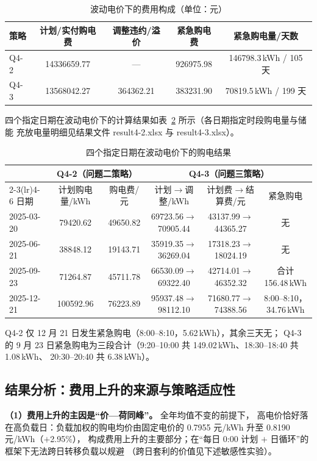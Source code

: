 \begin{table}[!htbp]
\caption{波动电价下的费用构成（单位：元）}\label{tab:q4-comp}
\centering
\small
\setlength{\tabcolsep}{5pt}
\begin{tabular}{lcccc}
\toprule
策略 & 计划/实付购电费 & 调整违约/溢价 & 紧急购电费 & 紧急购电量/天数 \\
\midrule
Q4-2 & 14336659.77 & --- & 926975.98 & 146798.3\,kWh / 105 天 \\
Q4-3 & 13568042.27 & 364362.21 & 383231.90 & 70819.5\,kWh / 199 天 \\
\bottomrule
\end{tabular}
\end{table}

四个指定日期在波动电价下的计算结果如表~\ref{tab:q4-days} 所示（各日期指定时段购电量与储能
充放电量明细见结果文件 result4-2.xlsx 与 result4-3.xlsx）。

\begin{table}[!htbp]
\caption{四个指定日期在波动电价下的购电结果}\label{tab:q4-days}
\centering
\small
\setlength{\tabcolsep}{4pt}
\begin{tabular}{lccccc}
\toprule
 & \multicolumn{2}{c}{Q4-2（问题二策略）} & \multicolumn{3}{c}{Q4-3（问题三策略）} \\
\cmidrule(lr){2-3}\cmidrule(lr){4-6}
日期 & 计划购电量/kWh & 购电费/元 & 计划$\to$调整/kWh & 计划费$\to$结算费/元 & 紧急购电 \\
\midrule
2025-03-20 & 79420.62 & 49650.82 & 69723.56$\to$70905.44 & 43137.99$\to$44365.27 & 无 \\
2025-06-21 & 38848.12 & 19143.71 & 35919.35$\to$36269.04 & 17318.23$\to$18024.19 & 无 \\
2025-09-23 & 71264.87 & 45711.78 & 66530.09$\to$69322.40 & 42714.01$\to$46352.32 & 合计 156.48\,kWh \\
2025-12-21 & 100592.96 & 76223.89 & 95937.48$\to$98112.10 & 71680.77$\to$74388.56 & 8:00--8:10，34.76\,kWh \\
\bottomrule
\end{tabular}
\end{table}

Q4-2 仅 12 月 21 日发生紧急购电（8:00--8:10，5.62\,kWh），其余三天无；
Q4-3 的 9 月 23 日紧急购电为三段合计（9:20--10:00 共 149.02\,kWh、18:30--18:40 共 1.08\,kWh、
20:30--20:40 共 6.38\,kWh）。

\subsection{结果分析：费用上升的来源与策略适应性}
\textbf{（1）费用上升的主因是“价—荷同峰”。} 全年均值不变的前提下，
高电价恰好落在高负载日：负载加权的购电均价由固定电价的 0.7955 元/kWh 升至 0.8190 元/kWh（$+$2.95\%），
构成费用上升的主要部分；在“每日 0:00 计划 $+$ 日循环”的框架下无法跨日转移负载以规避
（跨日套利的价值见下述敏感性实验）。

